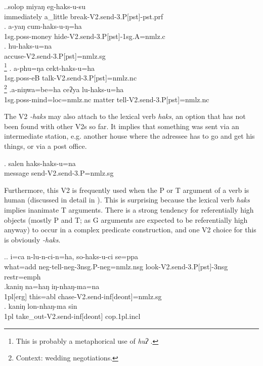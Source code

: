 \ex.\ag.solop miyaŋ eg-haks-u-su\\
immediately a\_little break{\sc -V2.send-3.P[pst]-pst.prf}\\
 
\bg. a-yaŋ cum-haks-u-ŋ=ha\\
{\sc 1sg.poss-}money hide{\sc -V2.send-3.P[pst]-1sg.A=nmlz.c}\\
\bg. hu-haks-u=na\\
accuse{\sc -V2.send-3.P[pst]=nmlz.sg}\\
\footnote{This is probably a metaphorical use of \emph{huʔ} .}
\bg. a-phu=ŋa cekt-haks-u=ha\\
{\sc 1sg.poss-}eB talk{\sc -V2.send-3.P[pst]=nmlz.nc}\\
\footnote{Context: wedding negotiations.} 
\bg.a-niŋwa=be=ha ceʔya lu-haks-u=ha\\
{\sc 1sg.poss-}mind{\sc =loc=nmlz.nc} matter tell{\sc -V2.send-3.P[pst]=nmlz.nc}\\


The V2 \emph{-haks} may also attach to the lexical verb \emph{haks}, an option that has not been found with other V2s so far. It implies that something was sent via an intermediate station, e.g. another house where the adressee has to go and get his things, or via a post office. 

\exg. salen haks-haks-u=na\\
message send{\sc -V2.send-3.P=nmlz.sg}\\


Furthermore, this V2 is frequently used when the P or T argument of a verb is human (discussed in detail in ). This is surprising because the lexical verb \emph{haks}  implies inanimate T arguments. There is a strong tendency for referentially high objects (mostly P and T; as G arguments are expected to be referentially high anyway) to occur in a complex predicate construction, and one V2 choice for this is obviously \emph{-haks}.

\ex.\ag. i=ca n-lu-n-ci-n=ha, so-haks-u-ci se=ppa\\
what{\sc =add} {\sc neg-}tell{\sc -neg-3nsg.P-neg=nmlz.nsg}  look{\sc -V2.send-3.P[pst]-3nsg} {\sc restr=emph}\\
 
\bg.kaniŋ na=haŋ    iŋ-nhaŋ-ma=na\\
{\sc 1pl[erg]} this{\sc =abl} chase{\sc -V2.send-inf[deont]=nmlz.sg}\\
 
\bg. kaniŋ lon-nhaŋ-ma sin\\
{\sc 1pl} take\_out{\sc -V2.send-inf[deont]} {\sc cop.1pl.incl}\\

